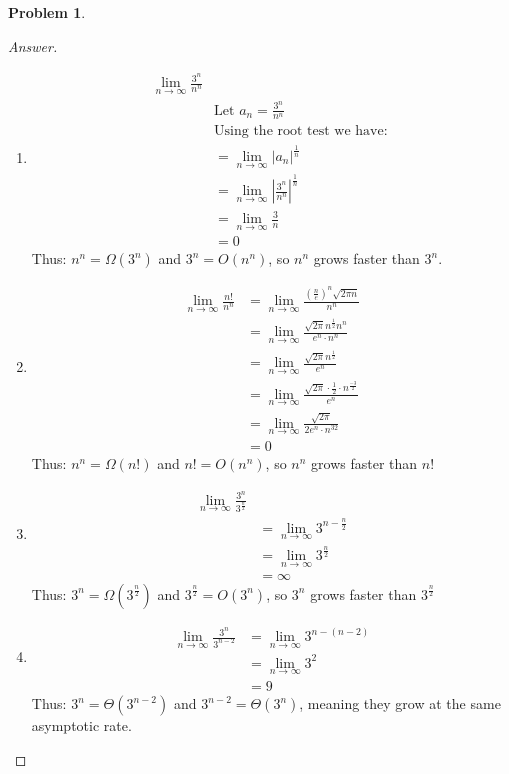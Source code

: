 \documentclass[11pt]{article}
\theoremstyle{definition}
\theoremstyle{definition}
\newtheorem{required}{Problem}
\theoremstyle{definition}
\begin{document}
\begin{required}
\begin{enumerate}[label=(\alph*)]
\begin{proof}[Answer]
\begin{enumerate}
\item
\begin{align*}
\lim_{n \to \infty} \frac{3^n}{n^n} \\
&\text{Let } a_n=  \frac{3^n}{n^n} \\
&\text{Using the root test we have: } \\
&=\lim_{n \to \infty} {|a_n|}^{\frac{1}{n}}\\
&=\lim_{n \to \infty} {|\frac{3^n}{n^n}|}^{\frac{1}{n}}\\
&=\lim_{n \to \infty} \frac{3}{n} \\
&= 0
\end{align*}
Thus: $n^n= \Omega(3^n)$ and $3^n=O(n^n)$, so $n^n$ grows faster than $3^n$.

\item
\begin{align*}
\lim_{n \to \infty} \frac{n!}{n^n} 
&=\lim_{n \to \infty} \frac{(\frac{n}{e})^n \sqrt{2 \pi n} }{n^n} \\
&=\lim_{n \to \infty} \frac{ \sqrt{2 \pi} n^{\frac{1}{2}} n^n }{e^n \cdot n^n} \\
&=\lim_{n \to \infty} \frac{ \sqrt{2 \pi} n^{\frac{1}{2}}}{e^n} \\
&=\lim_{n \to \infty} \frac{ \sqrt{2 \pi}\cdot \frac{1}{2}\cdot n^{\frac{-3}{2}}}{e^n} \\
&=\lim_{n \to \infty} \frac{ \sqrt{2 \pi}}{2e^n \cdot n^{{3}{2}}} \\
&=0
\end{align*}
Thus: $n^n= \Omega(n!)$ and $n!= O(n^n)$, so $n^n$ grows faster than $n!$

 
\item
\begin{align*}
\lim_{n \to \infty} \frac{3^n}{3^{\frac{n}{2}}} \\
&=\lim_{n \to \infty} 3^{n-\frac{n}{2}} \\
&=\lim_{n \to \infty} 3^{\frac{n}{2}} \\
&=\infty
\end{align*}
Thus: $3^n= \Omega(3^{\frac{n}{2}})$ and $3^{\frac{n}{2}}=O(3^n)$, so $3^n$ grows faster than $3^{\frac{n}{2}}$


\item
\begin{align*}
\lim_{n \to \infty} \frac{3^n}{3^{n-2}} 
&=\lim_{n \to \infty} 3^{n-(n-2)} \\
&=\lim_{n \to \infty} 3^{2} \\
&= 9
\end{align*}
Thus: $3^n= \Theta(3^{n-2})$ and $3^{n-2}= \Theta(3^n)$, meaning they grow at the same asymptotic rate. 


\end{enumerate}
\end{proof}
\end{enumerate}
\end{required}
\end{document}
